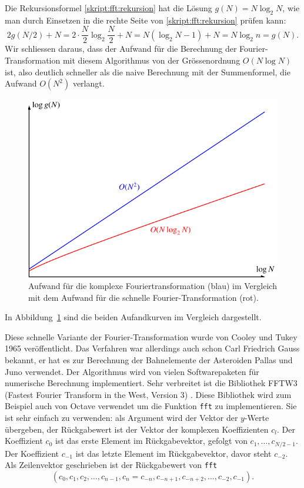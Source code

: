 Die Rekursionsformel
\eqref{skript:fft:rekursion}
hat die Lösung $g(N) = N\log_2 N$, wie man durch Einsetzen in die
rechte Seite von
\eqref{skript:fft:rekursion}
prüfen kann:
\[
2g(N/2) + N
=
2\cdot\frac{N}2\log_2\frac{N}2 + N
=
N(\log_2 N - 1) + N
=
N\log_2 n
=
g(N).
\]
Wir schliessen daraus, dass der Aufwand für die Berechnung der
Fourier-Transformation mit diesem Algorithmus von der Grössenordnung
$O(N\log N)$ ist, also deutlich schneller als die naive Berechnung
mit der Summenformel, die Aufwand $O(N^2)$ verlangt.
\begin{figure}
\centering
\includegraphics{chapters/6/fftaufwand.pdf}
\caption{Aufwand für die komplexe Fouriertransformation ({\color{blue}blau})
im Vergleich mit
dem Aufwand für die schnelle Fourier-Transformation ({\color{red}rot}).
\label{skript:fft:aufwandgraph}}
\end{figure}
In Abbildung~\ref{skript:fft:aufwandgraph} sind die beiden Aufandkurven im 
Vergleich dargestellt.

Diese schnelle Variante der Fourier-Transformation wurde von Cooley 
%
und Tukey 1965 veröffentlicht.
%
Das Verfahren war allerdings auch schon Carl Friedrich Gauss bekannt,
er hat es zur Berechnung der Bahnelemente der Asteroiden Pallas und
Juno verwendet.
Der Algorithmus wird von vielen Softwarepaketen für numerische Berechnung
implementiert.
Sehr verbreitet ist die Bibliothek FFTW3 (Fastest Fourier Transform in the
West, Version 3) \cite{skript:fftw}. 
Diese Bibliothek wird zum Beispiel auch von Octave verwendet um die
Funktion \texttt{fft} zu implementieren.
%
Sie ist sehr einfach zu verwenden: als Argument wird der Vektor der
$y$-Werte übergeben, der Rückgabewert ist der Vektor der komplexen
Koeffizienten $c_l$.
Der Koeffizient $c_0$ ist das erste Element im Rückgabevektor, gefolgt
von $c_1,\dots,c_{N/2-1}$.
Der Koeffizient $c_{-1}$ ist das letzte Element im Rückgabevektor, davor
steht $c_{-2}$.
Als Zeilenvektor geschrieben ist der Rückgabewert von \texttt{fft}
\[
( c_0, c_1, c_2, \dots , c_{n-1}, c_n=c_{-n},
c_{-n+1},c_{-n+2},\dots, c_{-2},c_{-1}).
\]


